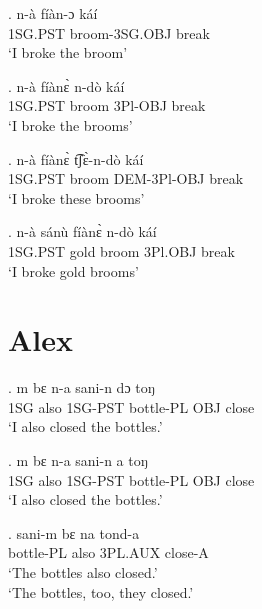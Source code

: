 \documentclass{assets/fieldnotes}
\begin{document}
\exg. n-à fíàn-ɔ káí\\
1SG.PST broom-3SG.OBJ break\\
`I broke the broom'

\exg. n-à fíànɛ̀ n-dò káí\\
1SG.PST broom   3Pl-OBJ break\\
`I broke the brooms'

\exg. n-à  fíànɛ̀ t͡ʃɛ̀-n-dò káí\\
1SG.PST broom DEM-3Pl-OBJ break\\
`I broke these brooms'

\exg. n-à sánù  fíànɛ̀ n-dò káí \\
1SG.PST gold broom 3Pl.OBJ break\\
`I broke gold brooms'


\section{Alex}

\exg.
m     bɛ     n-a       sani-n      dɔ    toŋ   \\
1SG   also   1SG-PST   bottle-PL   OBJ   close \\%
`I also closed the bottles.' \label{I also closed the bottles1}

\exg.
m     bɛ     n-a       sani-n      a     toŋ   \\
1SG   also   1SG-PST   bottle-PL   OBJ   close \\%
`I also closed the bottles.' \label{I also closed the bottles2}





\exg.
sani-m      bɛ     na        tond-a  \\
bottle-PL   also   3PL.AUX   close-A \\%
`The bottles also closed.' \label{The bottles also closed}\\
`The bottles, too, they closed.'
\end{document}
